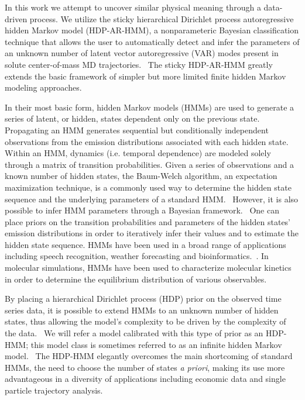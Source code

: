 \documentclass[journal=jpcbfk,manuscript=article]{achemso}
\begin{document}
  In this work we attempt to uncover similar physical meaning through a data-driven process. 
  We utilize the sticky hierarchical Dirichlet process autoregressive hidden Markov model 
  (HDP-AR-HMM), a nonparameteric Bayesian classification technique that allows the user to 
  automatically detect and infer the parameters of an unknown number of latent vector
  autoregressive (VAR) modes present in solute center-of-mass MD 
  trajectories.~\cite{fox_bayesian_2010} The sticky HDP-AR-HMM greatly extends the 
  basic framework of simpler but more limited finite hidden Markov modeling approaches.
    
  In their most basic form, hidden Markov models (HMMs) are used to generate
  a series of latent, or hidden, states dependent only on the previous state.~\cite{rabiner_tutorial_1989}
  Propagating an HMM generates sequential but conditionally independent observations from 
  the emission distributions associated with each hidden state. 
  Within an HMM, dynamics (i.e. temporal dependence) are modeled solely through  
  a matrix of transition probabilities. Given a series of observations and a known number of hidden states, the 
  Baum-Welch algorithm, an expectation maximization technique, is a commonly 
  used way to determine the hidden state sequence and the underlying parameters of
  a standard HMM.~\cite{baum_maximization_1970} However, it is also possible to infer
  HMM parameters through a Bayesian framework.~\cite{scott_bayesian_2002,jasra_markov_2005} 
  One can place priors on the transition probabilities and parameters of the hidden 
  states' emission distributions in order to iteratively infer their values and to
  estimate the hidden state sequence. HMMs have been used in a broad range of applications
  including speech recognition, weather forecasting and bioinformatics.~\cite{juang_hidden_1984,hughes_non-homogeneous_1999,yoon_hidden_2009}.
  In molecular simulations, HMMs have been used to characterize molecular kinetics
  in order to determine the equilibrium distribution of various observables.~\cite{thayer_hidden_2002,singhal_using_2004,noe_probability_2008,noe_projected_2013}
  
  By placing a hierarchical Dirichlet process (HDP) prior on the observed time
  series data, it is possible to extend HMMs to an unknown number of hidden
  states, thus allowing the model's complexity to be driven by the complexity
  of the data.~\cite{teh_hierarchical_2006} We will refer a model calibrated with
  this type of prior as an HDP-HMM; this model class is sometimes referred to
  as an infinite hidden Markov model.~\cite{beal_infinite_2002} The HDP-HMM 
  elegantly overcomes the main shortcoming of standard HMMs, the need to choose
  the number of states \textit{a priori}, making its use more advantageous in
  a diversity of applications including economic data and single particle trajectory 
  analysis.~\cite{shi_identifying_2016,hines_analyzing_2015,sgouralis_introduction_2017,jazani_alternative_2019,wang_single-molecule_2014,persson_extracting_2013} 
\end{document}
